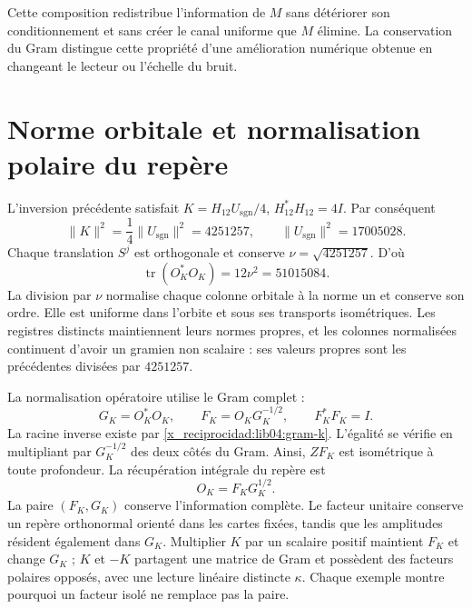 Cette composition redistribue l’information de \(M\) sans détériorer
son conditionnement et sans créer le canal uniforme que \(M\) élimine.
La conservation du Gram distingue cette propriété d’une amélioration
numérique obtenue en changeant le lecteur ou l’échelle du bruit.

\section{Norme orbitale et normalisation polaire du repère}
\label{x_reciprocidad:lib04:normalizacion}

L’inversion précédente satisfait
\(K=H_{12}U_{\mathrm{sgn}}/4\),
\(H_{12}^*H_{12}=4I\). Par conséquent
\begin{equation}
 \|K\|^2=\frac14\|U_{\mathrm{sgn}}\|^2=4251257,
 \qquad \|U_{\mathrm{sgn}}\|^2=17005028.
 \label{x_reciprocidad:lib04:norma-k}
\end{equation}
Chaque translation \(S^j\) est orthogonale et conserve
\(\nu=\sqrt{4251257}\). D’où
\begin{equation}
 \operatorname{tr}(O_K^*O_K)=12\nu^2=51015084.
 \label{x_reciprocidad:lib04:traza-marco}
\end{equation}
La division par \(\nu\) normalise chaque colonne orbitale à la norme
un et conserve son ordre. Elle est uniforme dans l’orbite et sous ses
transports isométriques. Les registres distincts maintiennent leurs normes
propres, et les colonnes normalisées continuent d’avoir un gramien
non scalaire : ses valeurs propres sont les précédentes divisées par
\(4251257\).

La normalisation opératoire utilise le Gram complet :
\begin{equation}
 G_K=O_K^*O_K,\qquad
 F_K=O_KG_K^{-1/2},\qquad
 F_K^*F_K=I.
 \label{x_reciprocidad:lib04:polar}
\end{equation}
La racine inverse existe par \eqref{x_reciprocidad:lib04:gram-k}. L’égalité se
vérifie en multipliant par \(G_K^{-1/2}\) des deux côtés du Gram.
Ainsi, \(ZF_K\) est isométrique à toute profondeur.
La récupération intégrale du repère est
\begin{equation}
 O_K=F_KG_K^{1/2}.
 \label{x_reciprocidad:lib04:polar-inversa}
\end{equation}
La paire \((F_K,G_K)\) conserve l'information complète. Le facteur unitaire conserve un repère orthonormal orienté dans les cartes fixées, tandis que les amplitudes résident également dans \(G_K\). Multiplier \(K\) par un scalaire positif maintient \(F_K\) et change \(G_K\) ; \(K\) et \(-K\) partagent une matrice de Gram et possèdent des facteurs polaires opposés, avec une lecture linéaire distincte \(\kappa\). Chaque exemple montre pourquoi un facteur isolé ne remplace pas la paire.

